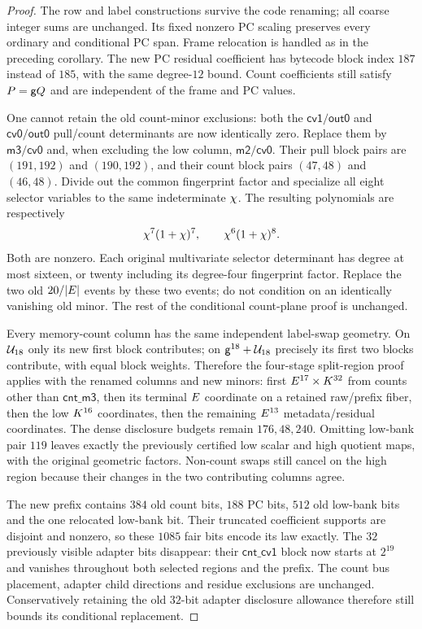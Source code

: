 \begin{proof}
The row and label constructions survive the code renaming; all coarse integer sums are unchanged. Its fixed nonzero PC scaling preserves every ordinary and conditional PC span. Frame relocation is handled as in the preceding corollary. The new PC residual coefficient has bytecode block index $187$ instead of $185$, with the same degree-$12$ bound. Count coefficients still satisfy $P=\mathsf{g} Q$ and are independent of the frame and PC values.

One cannot retain the old count-minor exclusions: both the $\mathsf{cv1}/\mathsf{out0}$ and $\mathsf{cv0}/\mathsf{out0}$ pull/count determinants are now identically zero. Replace them by $\mathsf{m3}/\mathsf{cv0}$ and, when excluding the low column, $\mathsf{m2}/\mathsf{cv0}$. Their pull block pairs are $(191,192)$ and $(190,192)$, and their count block pairs $(47,48)$ and $(46,48)$. Divide out the common fingerprint factor and specialize all eight selector variables to the same indeterminate $\chi$. The resulting polynomials are respectively
\[
 \chi^7(1+\chi)^7,\qquad \chi^6(1+\chi)^8.
\]
Both are nonzero. Each original multivariate selector determinant has degree at most sixteen, or twenty including its degree-four fingerprint factor. Replace the two old $20/|E|$ events by these two events; do not condition on an identically vanishing old minor. The rest of the conditional count-plane proof is unchanged.

Every memory-count column has the same independent label-swap geometry. On $\mathcal{U}_{18}$ only its new first block contributes; on $\mathsf{g}^{18}+\mathcal{U}_{18}$ precisely its first two blocks contribute, with equal block weights. Therefore the four-stage split-region proof applies with the renamed columns and new minors: first $E^{17}\times K^{32}$ from counts other than $\mathsf{cnt\_m3}$, then its terminal $E$ coordinate on a retained raw/prefix fiber, then the low $K^{16}$ coordinates, then the remaining $E^{13}$ metadata/residual coordinates. The dense disclosure budgets remain $176,48,240$. Omitting low-bank pair $119$ leaves exactly the previously certified low scalar and high quotient maps, with the original geometric factors. Non-count swaps still cancel on the high region because their changes in the two contributing columns agree.

The new prefix contains $384$ old count bits, $188$ PC bits, $512$ old low-bank bits and the one relocated low-bank bit. Their truncated coefficient supports are disjoint and nonzero, so these $1085$ fair bits encode its law exactly. The $32$ previously visible adapter bits disappear: their $\mathsf{cnt\_cv1}$ block now starts at $2^{19}$ and vanishes throughout both selected regions and the prefix. The count bus placement, adapter child directions and residue exclusions are unchanged. Conservatively retaining the old $32$-bit adapter disclosure allowance therefore still bounds its conditional replacement.


\end{proof}
